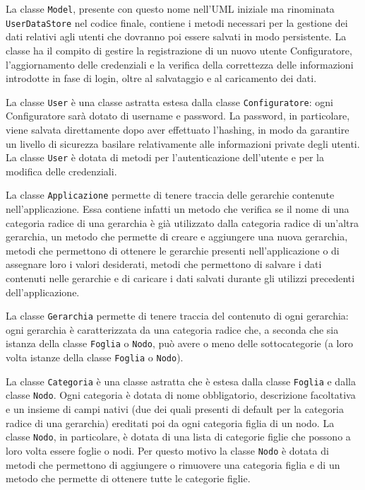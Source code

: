 La classe \texttt{Model}, presente con questo nome nell'UML iniziale ma rinominata \texttt{UserDataStore} nel codice finale, contiene i metodi necessari per la gestione dei dati relativi agli utenti che dovranno poi essere salvati in modo persistente. La classe ha il compito di gestire la registrazione di un nuovo utente Configuratore, l'aggiornamento delle credenziali e la verifica della correttezza delle informazioni introdotte in fase di login, oltre al salvataggio e al caricamento dei dati. 

La classe \texttt{User} è una classe astratta estesa dalla classe \texttt{Configuratore}: ogni Configuratore sarà dotato di username e password. La password, in particolare, viene salvata direttamente dopo aver effettuato l'hashing, in modo da garantire un livello di sicurezza basilare relativamente alle informazioni private degli utenti. La classe \texttt{User} è dotata di metodi per l'autenticazione dell'utente e per la modifica delle credenziali.

La classe \texttt{Applicazione} permette di tenere traccia delle gerarchie contenute nell'applicazione. 
Essa contiene infatti un metodo che verifica se il nome di una categoria radice di una gerarchia è già utilizzato dalla categoria radice di un'altra gerarchia, un metodo che permette di creare e aggiungere una nuova gerarchia, metodi che permettono di ottenere le gerarchie presenti nell'applicazione o di assegnare loro i valori desiderati, metodi che permettono di salvare i dati contenuti nelle gerarchie e di caricare i dati salvati durante gli utilizzi precedenti dell'applicazione.

La classe \texttt{Gerarchia} permette di tenere traccia del contenuto di ogni gerarchia: ogni gerarchia è caratterizzata da una categoria radice che, a seconda che sia istanza della classe \texttt{Foglia} o \texttt{Nodo}, può avere o meno delle sottocategorie (a loro volta istanze della classe \texttt{Foglia} o \texttt{Nodo}). 

La classe \texttt{Categoria} è una classe astratta che è estesa dalla classe \texttt{Foglia} e dalla classe \texttt{Nodo}. Ogni categoria è dotata di nome obbligatorio, descrizione facoltativa e un insieme di campi nativi (due dei quali presenti di default per la categoria radice di una gerarchia) ereditati poi da ogni categoria figlia di un nodo.
La classe \texttt{Nodo}, in particolare, è dotata di una lista di categorie figlie che possono a loro volta essere foglie o nodi. Per questo motivo la classe \texttt{Nodo} è dotata di metodi che permettono di aggiungere o rimuovere una categoria figlia e di un metodo che permette di ottenere tutte le categorie figlie.

